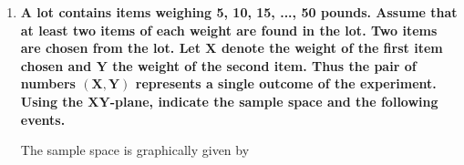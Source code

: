 \documentclass[10pt, oneside]{article}
\begin{document}
\begin{enumerate}[label=1.\arabic*]
\begin{enumerate}
	\begin{framed}
	\begin{align*}
	B &= \{ abcd, abdc, acbd, acdb, adbc, adcb, bacd, badc, bcad, bcda, bdac, bdca, \\
	&cabd, cadb, cbad, cbda, cdab, cdba, dabc, dacb, dbac, dbca, dcab, dcba \} 
	\end{align*}
	\end{framed}
	
	\item  \begin{tcolorbox}[
	  colback=Cerulean!5!white,
	  colframe=Cerulean!75!black]
	\textbf{List all elements of the events $\bm{A \cap B}$ and $\bm{A \cup B}$.}
	\end{tcolorbox}
	
	\begin{framed}
	\begin{align*}
	A \cap B &= \{ abcd, abdc \} \\
	A \cup B &= \{ abcd, abdc, acbd, acdb, adbc, adcb, cbad, cbda, dbac, dbca \}
	\end{align*}
	\end{framed}
	
	\end{enumerate}

\item  \begin{tcolorbox}[
  colback=Cerulean!5!white,
  colframe=Cerulean!75!black]
\textbf{A lot contains items weighing 5, 10, 15, ..., 50 pounds. Assume that at least two items of each weight are found in the lot. Two items are chosen from the lot. Let $\bm{X}$ denote the weight of the first item chosen and $\bm{Y}$ the weight of the second item. Thus the pair of numbers $\bm{(X,Y)}$ represents a single outcome of the experiment. Using the $\bm{XY}$-plane, indicate the sample space and the following events.}
\end{tcolorbox}

The sample space is graphically given by


\end{enumerate}
\end{document}
